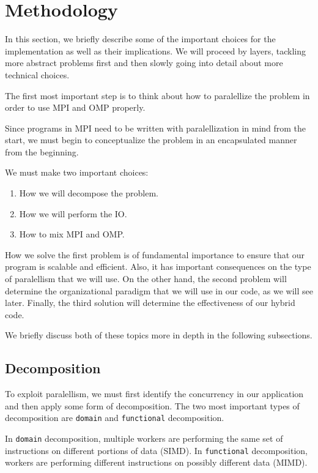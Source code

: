 \documentclass{report}
\begin{document}
\section{Methodology}

In this section, we briefly describe some of the important choices for the 
implementation as well as their implications. We will proceed by layers, 
tackling more abstract problems first and then slowly 
going into detail about more technical choices. 

The first most important step is to think about how to paralellize the problem 
in order to use MPI and OMP properly.

Since programs in MPI need to be written with paralellization in mind 
from the start, we must begin to conceptualize the problem in an encapsulated 
manner from the beginning.

We must make two important choices: 

\begin{enumerate}
    \item How we will decompose the problem. 
    \item How we will perform the IO. 
    \item How to mix MPI and OMP.
\end{enumerate}

How we solve the first problem is of fundamental importance to ensure that our 
program is scalable and efficient. Also, it has important consequences on the 
type of paralellism that we will use. 
On the other hand, the second problem will determine the organizational paradigm 
that we will use in our code, as we will see later.
Finally, the third solution will determine the effectiveness of our hybrid code.

We briefly discuss both of these topics more in depth in the following 
subsections.

\subsection{Decomposition}

To exploit paralellism, we must first identify the concurrency in our 
application and then apply some form of decomposition. The two most important 
types of decomposition are \texttt{domain} and \texttt{functional} decomposition. 

In \texttt{domain} decomposition, multiple workers are performing the same set of 
instructions on different portions of data (SIMD). In \texttt{functional} 
decomposition, workers are performing different instructions on possibly 
different data (MIMD). 
 
\end{document}
